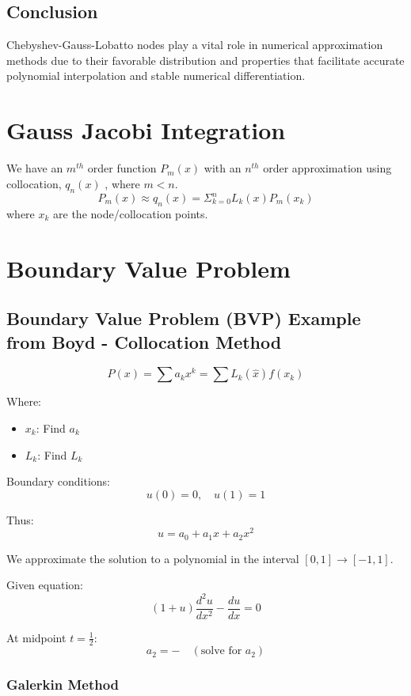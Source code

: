 \documentclass[12pt]{report} %
\begin{document}
\section{Conclusion}
Chebyshev-Gauss-Lobatto nodes play a vital role in numerical approximation methods due to their favorable distribution and properties that facilitate accurate polynomial interpolation and stable numerical differentiation.



\chapter{Gauss Jacobi Integration}

We have an $m^{th}$ order function $P_m (x)$ with an $n^{th}$ order approximation using collocation, $q_n (x)$ , where $m < n$.
\[
P_m (x) \approx q_n (x) = \Sigma_{k = 0}^{n} L_k (x) P_m (x_k)
\]
where $x_k$ are the node/collocation points.\\

\chapter{Boundary Value Problem}

\section*{Boundary Value Problem (BVP) Example from Boyd - Collocation Method}

\[
P(x) = \sum a_k x^k = \sum L_k(\hat{x}) f(x_k)
\]

Where:
\begin{itemize}
    \item \( x_k \): Find \( a_k \)
    \item \( L_k \): Find \( L_k \)
\end{itemize}

Boundary conditions:
\[
u(0) = 0, \quad u(1) = 1
\]

Thus:
\[
u = a_0 + a_1 x + a_2 x^2
\]

We approximate the solution to a polynomial in the interval \( [0, 1] \rightarrow [-1, 1] \).

Given equation:
\[
(1 + u) \frac{d^2 u}{dx^2} - \frac{du}{dx} = 0
\]

At midpoint \( t = \frac{1}{2} \):
\[
a_2 = - \quad (\text{solve for } a_2)
\]

\subsection*{Galerkin Method}
\end{document}
